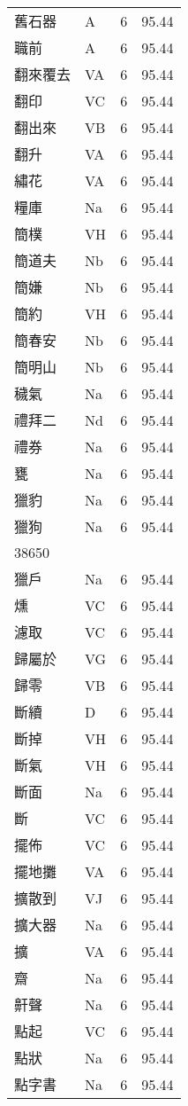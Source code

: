 \documentclass[twocolumn]{book}
\begin{document}
\begin{supertabular}{llrr}
舊石器 & A & 6 &  95.44\\
職前 & A & 6 &  95.44\\
翻來覆去 & VA & 6 &  95.44\\
翻印 & VC & 6 &  95.44\\
翻出來 & VB & 6 &  95.44\\
翻升 & VA & 6 &  95.44\\
繡花 & VA & 6 &  95.44\\
糧庫 & Na & 6 &  95.44\\
簡樸 & VH & 6 &  95.44\\
簡道夫 & Nb & 6 &  95.44\\
簡嫌 & Nb & 6 &  95.44\\
簡約 & VH & 6 &  95.44\\
簡春安 & Nb & 6 &  95.44\\
簡明山 & Nb & 6 &  95.44\\
穢氣 & Na & 6 &  95.44\\
禮拜二 & Nd & 6 &  95.44\\
禮券 & Na & 6 &  95.44\\
甕 & Na & 6 &  95.44\\
獵豹 & Na & 6 &  95.44\\
獵狗 & Na & 6 &  95.44\\
38650\\
獵戶 & Na & 6 &  95.44\\
燻 & VC & 6 &  95.44\\
濾取 & VC & 6 &  95.44\\
歸屬於 & VG & 6 &  95.44\\
歸零 & VB & 6 &  95.44\\
斷續 & D & 6 &  95.44\\
斷掉 & VH & 6 &  95.44\\
斷氣 & VH & 6 &  95.44\\
斷面 & Na & 6 &  95.44\\
斷 & VC & 6 &  95.44\\
擺佈 & VC & 6 &  95.44\\
擺地攤 & VA & 6 &  95.44\\
擴散到 & VJ & 6 &  95.44\\
擴大器 & Na & 6 &  95.44\\
擴 & VA & 6 &  95.44\\
齋 & Na & 6 &  95.44\\
鼾聲 & Na & 6 &  95.44\\
點起 & VC & 6 &  95.44\\
點狀 & Na & 6 &  95.44\\
點字書 & Na & 6 &  95.44\\

\end{supertabular}
\end{document}
